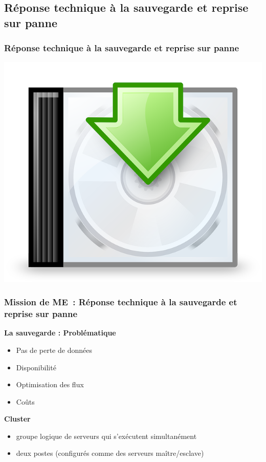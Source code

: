 
\subsection{Réponse technique à la sauvegarde et reprise sur panne}
\begin{frame}
\frametitle{Réponse technique à la sauvegarde et reprise sur panne}
\begin{center}
\includegraphics[scale=0.2]{Images/sauvegarde}
\end{center}
\end{frame}

\begin{frame}
\frametitle{Mission de ME~: Réponse technique à la sauvegarde et reprise sur panne}
\begin{block}{\textbf{La sauvegarde : Problématique}}
\begin{itemize}
\item Pas de perte de données
\item Disponibilité
\item Optimisation des flux
\item Coûts
\end{itemize}
\end{block}
\begin{block}{\textbf{Cluster}}
\begin{itemize}
\item groupe logique de serveurs qui s'exécutent simultanément
\item deux postes (configurés comme des serveurs maître/esclave)
\end{itemize}
\end{block}
\end{frame}

